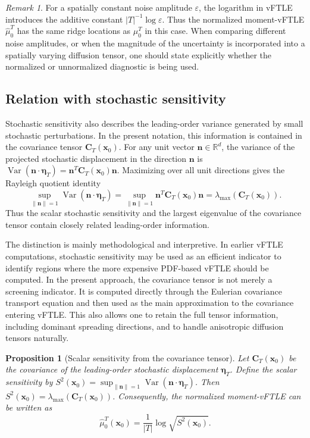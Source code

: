 \documentclass[a4paper,11pt]{article}
\numberwithin{equation}{section}
\theoremstyle{plain}
\newtheorem{proposition}[theorem]{Proposition}
\theoremstyle{definition}
\theoremstyle{remark}
\newtheorem{remark}[theorem]{Remark}
\newcommand{\R}{\mathbb{R}}
\newcommand{\bx}{\mathbf{x}}
\newcommand{\bn}{\mathbf{n}}
\newcommand{\bC}{\mathbf{C}}
\newcommand{\etaVec}{\boldsymbol{\eta}}
\newcommand{\Var}{\operatorname{Var}}
\newcommand{\lmax}{\lambda_{\max}}
\begin{document}
\begin{remark}
For a spatially constant noise amplitude \(\varepsilon\), the logarithm in vFTLE introduces the additive constant \(|T|^{-1}\log\varepsilon\).  Thus the normalized moment-vFTLE \(\widehat{\mu}_0^T\) has the same ridge locations as \(\mu_0^T\) in this case.  When comparing different noise amplitudes, or when the magnitude of the uncertainty is incorporated into a spatially varying diffusion tensor, one should state explicitly whether the normalized or unnormalized diagnostic is being used.
\end{remark}

\subsection{Relation with stochastic sensitivity}

Stochastic sensitivity also describes the leading-order variance generated by small stochastic perturbations.  In the present notation, this information is contained in the covariance tensor \(\bC_T(\bx_0)\).  For any unit vector \(\bn\in\R^d\), the variance of the projected stochastic displacement in the direction \(\bn\) is \(\Var(\bn\cdot\etaVec_T)=\bn^T\bC_T(\bx_0)\bn\).  Maximizing over all unit directions gives the Rayleigh quotient identity
\[
    \sup_{\|\bn\|=1}\Var(\bn\cdot\etaVec_T)
    =
    \sup_{\|\bn\|=1}\bn^T\bC_T(\bx_0)\bn
    =
    \lmax(\bC_T(\bx_0)).
\]
Thus the scalar stochastic sensitivity and the largest eigenvalue of the covariance tensor contain closely related leading-order information.

The distinction is mainly methodological and interpretive.  In earlier vFTLE computations, stochastic sensitivity may be used as an efficient indicator to identify regions where the more expensive PDF-based vFTLE should be computed.  In the present approach, the covariance tensor is not merely a screening indicator.  It is computed directly through the Eulerian covariance transport equation and then used as the main approximation to the covariance entering vFTLE.  This also allows one to retain the full tensor information, including dominant spreading directions, and to handle anisotropic diffusion tensors naturally.

\begin{proposition}[Scalar sensitivity from the covariance tensor]
Let \(\bC_T(\bx_0)\) be the covariance of the leading-order stochastic displacement \(\etaVec_T\).  Define the scalar sensitivity by \(S^2(\bx_0)=\sup_{\|\bn\|=1}\Var(\bn\cdot\etaVec_T)\).  Then \(S^2(\bx_0)=\lmax(\bC_T(\bx_0))\).  Consequently, the normalized moment-vFTLE can be written as
\[
    \widehat{\mu}_0^T(\bx_0)
    =
    \frac{1}{|T|}
    \log\sqrt{S^2(\bx_0)} .
\]
\end{proposition}
\end{document}
